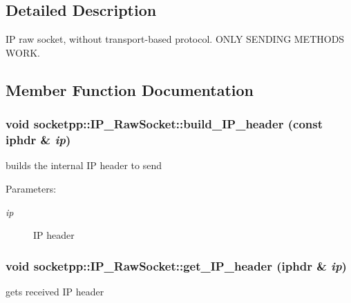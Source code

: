 \subsection{Detailed Description}
IP raw socket, without transport-based protocol. ONLY SENDING METHODS WORK. 

\subsection{Member Function Documentation}
\hypertarget{classsocketpp_1_1IP__RawSocket_f93c51a7a8284fe9d2b24019b13a5803}{
\subsubsection[{build\_\-IP\_\-header}]{\setlength{\rightskip}{0pt plus 5cm}void socketpp::IP\_\-RawSocket::build\_\-IP\_\-header (const iphdr \& {\em ip})}}
\label{classsocketpp_1_1IP__RawSocket_f93c51a7a8284fe9d2b24019b13a5803}


builds the internal IP header to send 

\begin{Desc}
\item[Parameters:]
\begin{description}
\item[{\em ip}]IP header \end{description}
\end{Desc}
\hypertarget{classsocketpp_1_1IP__RawSocket_e477f483d5a8baa76c60399d0809d043}{
\subsubsection[{get\_\-IP\_\-header}]{\setlength{\rightskip}{0pt plus 5cm}void socketpp::IP\_\-RawSocket::get\_\-IP\_\-header (iphdr \& {\em ip})}}
\label{classsocketpp_1_1IP__RawSocket_e477f483d5a8baa76c60399d0809d043}


gets received IP header 

